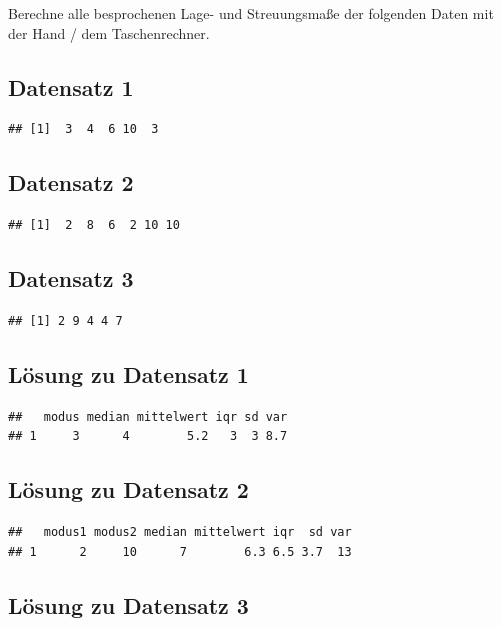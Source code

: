 \documentclass[
]{book}
\begin{document}
Berechne alle besprochenen Lage- und Streuungsmaße der folgenden Daten mit der Hand / dem Taschenrechner.

\hypertarget{datensatz-1}{%
\subsection{Datensatz 1}\label{datensatz-1}}

\begin{verbatim}
## [1]  3  4  6 10  3
\end{verbatim}

\hypertarget{datensatz-2}{%
\subsection{Datensatz 2}\label{datensatz-2}}

\begin{verbatim}
## [1]  2  8  6  2 10 10
\end{verbatim}

\hypertarget{datensatz-3}{%
\subsection{Datensatz 3}\label{datensatz-3}}

\begin{verbatim}
## [1] 2 9 4 4 7
\end{verbatim}

\hypertarget{luxf6sung-zu-datensatz-1}{%
\subsection{Lösung zu Datensatz 1}\label{luxf6sung-zu-datensatz-1}}

\begin{verbatim}
##   modus median mittelwert iqr sd var
## 1     3      4        5.2   3  3 8.7
\end{verbatim}

\hypertarget{luxf6sung-zu-datensatz-2}{%
\subsection{Lösung zu Datensatz 2}\label{luxf6sung-zu-datensatz-2}}

\begin{verbatim}
##   modus1 modus2 median mittelwert iqr  sd var
## 1      2     10      7        6.3 6.5 3.7  13
\end{verbatim}

\hypertarget{luxf6sung-zu-datensatz-3}{%
\subsection{Lösung zu Datensatz 3}\label{luxf6sung-zu-datensatz-3}}
\end{document}
